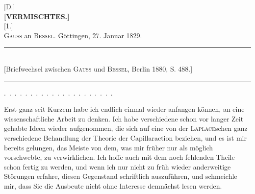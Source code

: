 \clearpage\begingroup{}\NoSourceHead
\begin{center}
[D.]\\[.7em]
\textbf{[VERMISCHTES.]}\\[1.2em]
[1.]\\[.7em]
\textsc{Gauss} an \textsc{Bessel}. Göttingen, 27. Januar 1829.
\par\smallskip\rule{.72\textwidth}{.35pt}\\
{\small [Briefwechsel zwischen \textsc{Gauss} und \textsc{Bessel}, Berlin 1880, S. 488.]}\\
\rule{.72\textwidth}{.35pt}
\end{center}
\noindent .\ .\ .\ .\ .\ .\ .\ .\ .\ .\ .\ .\ .\ .\ .\ .\ .\ .\ .\ .\ .
\par\noindent\hspace*{\parindent}Erst ganz seit Kurzem habe ich endlich einmal wieder anfangen können,
an eine wissenschaftliche Arbeit zu denken. Ich habe verschiedene schon vor
langer Zeit gehabte Ideen wieder aufgenommen, die sich auf eine von der
\textsc{Laplace}schen ganz verschiedene Behandlung der Theorie der Capillaraction
beziehen, und es ist mir bereits gelungen, das Meiste von dem, was mir früher
nur als möglich vorschwebte, zu verwirklichen. Ich hoffe auch mit dem noch
fehlenden Theile schon fertig zu werden, und wenn ich nur nicht zu früh
wieder anderweitige Störungen erfahre, diesen Gegenstand schriftlich auszuführen,
und schmeichle mir, dass Sie die Ausbeute nicht ohne Interesse demnächst
lesen werden.

